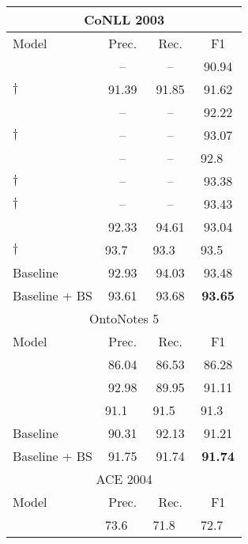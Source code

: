 \documentclass[11pt]{article}
\begin{document}
\begin{table}[!ht]
    \centering \small
    \begin{tabular}{lccc}
        \toprule
        \multicolumn{4}{c}{CoNLL 2003} \\
        \midrule
        Model & Prec. & Rec. & F1 \\
        \midrule
        \citet{lample-etal-2016-neural}     & -- & -- & 90.94 \\
        \citet{chiu-nichols-2016-named}$\dagger$ & 91.39 & 91.85 & 91.62 \\
        \citet{peters-etal-2018-deep}       & -- & -- & 92.22 \\
        \citet{akbik-etal-2018-contextual}$\dagger$ & -- & -- & 93.07 \\
        \citet{devlin-etal-2019-bert}       & -- & -- & 92.8~~ \\
        \citet{strakova-etal-2019-neural}$\dagger$ & -- & -- & 93.38 \\
        \citet{wang-etal-2019-crossweigh}$\dagger$ & -- & -- & 93.43 \\
        \citet{li-etal-2020-unified}        & 92.33 & 94.61 & 93.04 \\
        \citet{yu-etal-2020-named}$\dagger$ & 93.7~~ & 93.3~~ & 93.5~~ \\ 
        Baseline          & 92.93 & 94.03 & 93.48 \\
        Baseline + BS     & 93.61 & 93.68 & \textbf{93.65} \\
        \bottomrule
        \toprule
        \multicolumn{4}{c}{OntoNotes 5} \\
        \midrule
        Model & Prec. & Rec. & F1 \\
        \midrule
        \citet{chiu-nichols-2016-named} & 86.04 & 86.53 & 86.28 \\
        \citet{li-etal-2020-unified}    & 92.98 & 89.95 & 91.11 \\
        \citet{yu-etal-2020-named}      & 91.1~~ & 91.5~~ & 91.3~~ \\
        Baseline          & 90.31 & 92.13 & 91.21 \\
        Baseline + BS     & 91.75 & 91.74 & \textbf{91.74} \\
        \bottomrule
        \toprule
        \multicolumn{4}{c}{ACE 2004} \\
        \midrule
        Model & Prec. & Rec. & F1 \\
        \midrule
        \citet{katiyar-cardie-2018-nested}  & 73.6~~ & 71.8~~ & 72.7~~ \\

\end{tabular}
\end{table}
\end{document}
